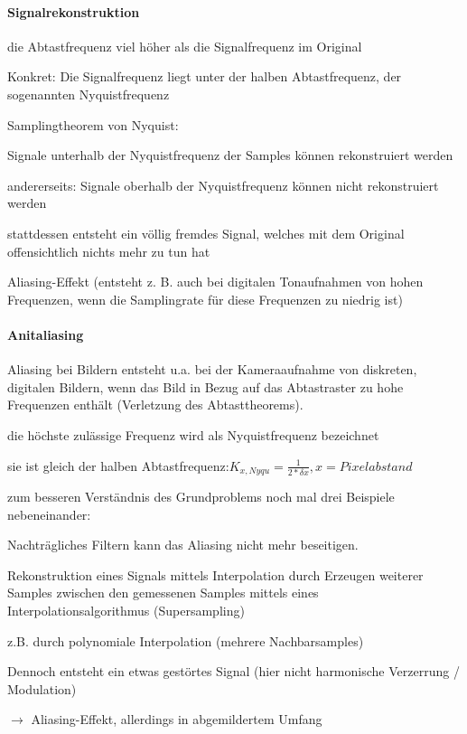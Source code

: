 \documentclass[landscape]{article}
\begin{document}
\begin{multicols}{3}
  
  \paragraph{Signalrekonstruktion}
  \begin{itemize*}
    \item die Abtastfrequenz viel höher als die Signalfrequenz im Original
    \item Konkret: Die Signalfrequenz liegt unter der halben Abtastfrequenz, der sogenannten Nyquistfrequenz
    \item Samplingtheorem von Nyquist:
    \begin{itemize*}
      \item Signale unterhalb der Nyquistfrequenz der Samples können rekonstruiert werden
      \item andererseits: Signale oberhalb der Nyquistfrequenz können nicht rekonstruiert werden
      \item stattdessen entsteht ein völlig fremdes Signal, welches mit dem Original offensichtlich nichts mehr zu tun hat
      \item Aliasing-Effekt (entsteht z. B. auch bei digitalen Tonaufnahmen von hohen Frequenzen, wenn die Samplingrate für diese Frequenzen zu niedrig ist)
    \end{itemize*}
  \end{itemize*}
  
  \paragraph{Anitaliasing}
  \begin{itemize*}
    \item Aliasing bei Bildern entsteht u.a. bei der Kameraaufnahme von diskreten, digitalen Bildern, wenn das Bild in Bezug auf das Abtastraster zu hohe Frequenzen enthält (Verletzung des Abtasttheorems).
    \item die höchste zulässige Frequenz wird als Nyquistfrequenz bezeichnet
    \begin{itemize*}
      \item sie ist gleich der halben Abtastfrequenz:$K_{x,Nyqu}=\frac{1}{2*\delta x}, x = Pixelabstand$
      \item zum besseren Verständnis des Grundproblems noch mal drei Beispiele nebeneinander:
      \item Nachträgliches Filtern kann das Aliasing nicht mehr beseitigen.
    \end{itemize*}
    \item Rekonstruktion eines Signals mittels Interpolation durch Erzeugen weiterer Samples zwischen den gemessenen Samples mittels eines Interpolationsalgorithmus (Supersampling)
    \item z.B. durch polynomiale Interpolation (mehrere Nachbarsamples)
    \item Dennoch entsteht ein etwas gestörtes Signal (hier nicht harmonische Verzerrung / Modulation)
    \item $\rightarrow$ Aliasing-Effekt, allerdings in abgemildertem Umfang
  \end{itemize*}
  

\end{multicols}
\end{document}
